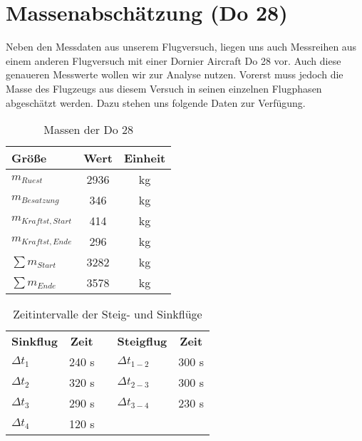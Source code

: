 \chapter{Massenabschätzung (Do 28)}
\label{chapter:masse}
Neben den Messdaten aus unserem Flugversuch, liegen uns auch Messreihen aus einem anderen Flugversuch mit einer Dornier Aircraft Do 28 vor. Auch diese genaueren Messwerte wollen wir zur Analyse nutzen. Vorerst muss jedoch die Masse des Flugzeugs aus diesem Versuch in seinen einzelnen Flugphasen abgeschätzt werden. Dazu stehen uns folgende Daten zur Verfügung. \\

\begin{table}[h]
	\centering
	\begin{tabular}{|l|c|c|}
		\hline
		\textbf{Größe}		 & \textbf{Wert}& \textbf{Einheit} \\ \hline
		$m_{Ruest}$  		 & 2936			& {kg}        \\ \hline
		$m_{Besatzung}$ 	 & 346			& {kg}		  \\ \hline
		$m_{Kraftst,Start}$	 & 414			& {kg}		  \\ \hline
		$m_{Kraftst,Ende}$	 & 296			& {kg}		  \\ \hline
		$\sum m_{Start}$	 & 3282			& {kg}		  \\ \hline
		$\sum m_{Ende}$	 & 3578			& {kg}		   \\ \hline
		
		
		
		
	\end{tabular}
	\caption{Massen der Do 28}
\end{table}


\begin{table}[h]
	\centering
	\begin{tabular}{|l|c|c|l|c|}
		\cline{1-2} \cline{4-5}
		\textbf{Sinkflug}		 & \textbf{Zeit}& \textbf{} & \textbf{Steigflug} & \textbf{Zeit} \\ \cline{1-2} \cline{4-5}
		$\Delta t_1$  & 240 {s} & & $\Delta t_{1-2}$ & 300 s         \\ \cline{1-2} \cline{4-5}
		$\Delta t_2$  & 320 {s} & & $\Delta t_{2-3}$ & 300 s		  \\ \cline{1-2} \cline{4-5}
		$\Delta t_3$	 & 290 {s} & & $\Delta t_{3-4}$ & 230 s	  \\ \cline{1-2} \cline{4-5}
		$\Delta t_4$	 & 120 {s} & &	&	  \\ \cline{1-2} \cline{4-5}
		
		
		
		
		
	\end{tabular}
	\caption{Zeitintervalle der Steig- und Sinkflüge} \label{tab:do28-deltat}
\end{table} 
\vspace{0.3cm} 

